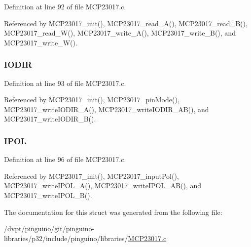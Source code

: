 Definition at line 92 of file M\-C\-P23017.\-c.



Referenced by M\-C\-P23017\-\_\-init(), M\-C\-P23017\-\_\-read\-\_\-\-A(), M\-C\-P23017\-\_\-read\-\_\-\-B(), M\-C\-P23017\-\_\-read\-\_\-\-W(), M\-C\-P23017\-\_\-write\-\_\-\-A(), M\-C\-P23017\-\_\-write\-\_\-\-B(), and M\-C\-P23017\-\_\-write\-\_\-\-W().

\hypertarget{structtag_m_c_p23017_a917722aa77aab52a7482a0c9efc2cf8a}{
\subsubsection[{I\-O\-D\-I\-R}]{ I\-O\-D\-I\-R}}\label{structtag_m_c_p23017_a917722aa77aab52a7482a0c9efc2cf8a}


Definition at line 93 of file M\-C\-P23017.\-c.



Referenced by M\-C\-P23017\-\_\-init(), M\-C\-P23017\-\_\-pin\-Mode(), M\-C\-P23017\-\_\-write\-I\-O\-D\-I\-R\-\_\-\-A(), M\-C\-P23017\-\_\-write\-I\-O\-D\-I\-R\-\_\-\-A\-B(), and M\-C\-P23017\-\_\-write\-I\-O\-D\-I\-R\-\_\-\-B().

\hypertarget{structtag_m_c_p23017_a39ac5b9ee3d963ab62dbbd439d543430}{
\subsubsection[{I\-P\-O\-L}]{ I\-P\-O\-L}}\label{structtag_m_c_p23017_a39ac5b9ee3d963ab62dbbd439d543430}


Definition at line 96 of file M\-C\-P23017.\-c.



Referenced by M\-C\-P23017\-\_\-init(), M\-C\-P23017\-\_\-input\-Pol(), M\-C\-P23017\-\_\-write\-I\-P\-O\-L\-\_\-\-A(), M\-C\-P23017\-\_\-write\-I\-P\-O\-L\-\_\-\-A\-B(), and M\-C\-P23017\-\_\-write\-I\-P\-O\-L\-\_\-\-B().



The documentation for this struct was generated from the following file\-:\begin{DoxyCompactItemize}
\item 
/dvpt/pinguino/git/pinguino-\/libraries/p32/include/pinguino/libraries/\hyperlink{_m_c_p23017_8c}{M\-C\-P23017.\-c}\end{DoxyCompactItemize}
